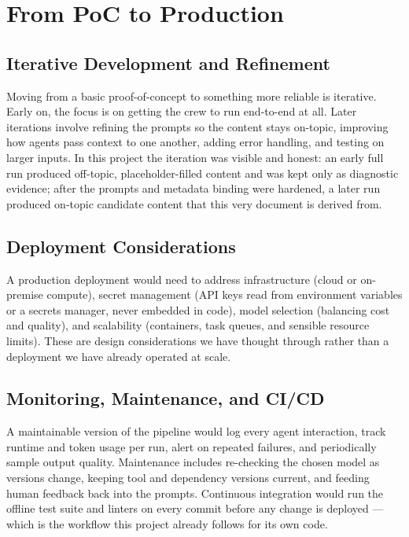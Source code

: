 
\chapter{From PoC to Production}

\section{Iterative Development and Refinement}

Moving from a basic proof-of-concept to something more reliable is iterative.
Early on, the focus is on getting the crew to run end-to-end at all. Later
iterations involve refining the prompts so the content stays on-topic,
improving how agents pass context to one another, adding error handling, and
testing on larger inputs. In this project the iteration was visible and
honest: an early full run produced off-topic, placeholder-filled content and
was kept only as diagnostic evidence; after the prompts and metadata binding
were hardened, a later run produced on-topic candidate content that this very
document is derived from.

\section{Deployment Considerations}

A production deployment would need to address infrastructure (cloud or
on-premise compute), secret management (API keys read from environment
variables or a secrets manager, never embedded in code), model selection
(balancing cost and quality), and scalability (containers, task queues, and
sensible resource limits). These are design considerations we have thought
through rather than a deployment we have already operated at scale.

\section{Monitoring, Maintenance, and CI/CD}

A maintainable version of the pipeline would log every agent interaction,
track runtime and token usage per run, alert on repeated failures, and
periodically sample output quality. Maintenance includes re-checking the
chosen model as versions change, keeping tool and dependency versions
current, and feeding human feedback back into the prompts. Continuous
integration would run the offline test suite and linters on every commit
before any change is deployed --- which is the workflow this project already
follows for its own code.
